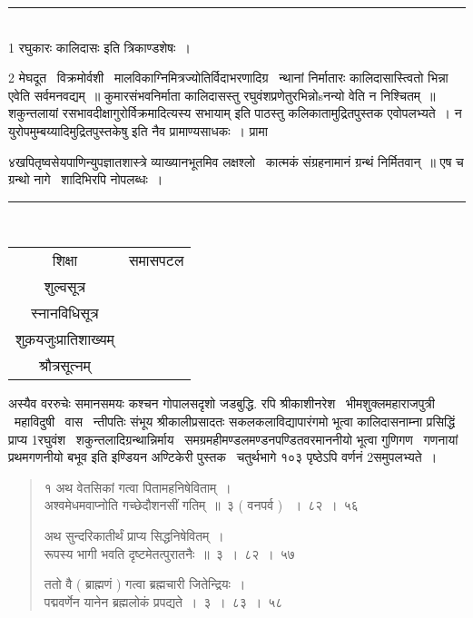 \documentclass[11pt, openany]{book}
\begin{document}
\begin{multicols}{2}
\noindent
\rule{1\linewidth}{0.5pt}\\

1 रघुकारः कालिदासः इति त्रिकाण्डशेषः~।

2 मेघदूत \textendash\ विक्रमोर्वशी \textendash\ मालविकाग्निमित्रज्योतिर्विदाभरणादिग्र \textendash\ न्थानां निर्मातारः कालिदासास्त्वितो भिन्ना एवेति सर्वमनवद्यम्~॥ कुमारसंभवनिर्माता कालिदासस्तु रघुवंशप्रणेतुरभिन्नोsनन्यो वेति न निश्चितम्~॥ शकुन्तलायां {\qt रसभावदीक्षागुरोर्विक्रमादित्यस्य सभायाम्} इति पाठस्तु कलिकातामुद्रितपुस्तक एवोपलभ्यते~। न युरोपमुम्बय्यादिमुद्रितपुस्तकेषु इति नैव प्रामाण्यसाधकः~। प्रामा \textendash\

\columnbreak

\noindent
४खपितृष्वसेयपाणिन्युपज्ञातशास्त्रे व्याख्यानभूतमिव लक्षश्लो \textendash\ कात्मकं संग्रहनामानं ग्रन्थं निर्मितवान्~॥ एष च ग्रन्थो नागे \textendash\ शादिभिरपि नोपलब्धः~।

\noindent
\rule{1\linewidth}{0.5pt}\\

\begin{tabular}{c c}
शिक्षा & समासपटल \\
शुल्वसूत्र & \\
स्नानविधिसूत्र & \\
शुक़यजुःप्रातिशाख्यम् & \\
श्रौत्रसूत्नम् & 
\end{tabular}

अस्यैव वररुचेः समानसमयः कश्चन गोपालसदृशो जडबुद्धि. रपि श्रीकाशीनरेश \textendash\ भीमशुक्लमहाराजपुत्री \textendash\ महाविदुषी \textendash\ वास \textendash\ न्तीपतिः संभूय श्रीकालीप्रसादतः सकलकलाविद्यापारंगमो भूत्वा कालिदासनाम्ना प्रसिद्धिं प्राप्य 1रघुवंश \textendash\ शकुन्तलादिग्रन्थान्निर्माय \textendash\ समग्रमहीमण्डलमण्डनपण्डितवरमाननीयो भूत्वा गुणिगण \textendash\ गणनायां प्रथमगणनीयो बभूव इति इण्डियन अण्टिकेरी पुस्तक \textendash\ चतुर्थभागे १०३ पृष्ठेऽपि वर्णनं 2समुपलभ्यते~।

\begin{quote}
{\mbh १ अथ वेतसिकां गत्वा पितामहनिषेविताम्~।\\
अश्वमेधमवाप्नोति गच्छेदौशनसीं गतिम्~॥~३ ( वनपर्व ) ~।~८२~।~५६

अथ सुन्दरिकातीर्थं प्राप्य सिद्धनिषेवितम्~। \\
रूपस्य भागी भवति दृष्टमेतत्पुरातनैः~॥~३~।~८२~।~५७

ततो वै ( ब्राह्मणं ) गत्वा ब्रह्मचारी जितेन्द्रियः~।\\
पद्मवर्णेन यानेन ब्रह्मलोकं प्रपद्यते~।~३~।~८३~।~५८

}
\end{quote}
\end{multicols}
\end{document}
